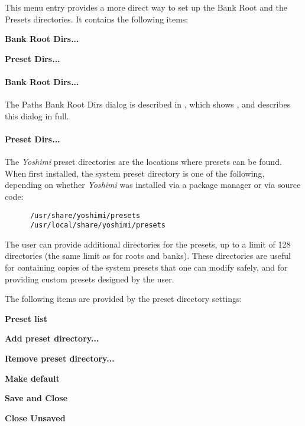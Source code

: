    This menu entry provides a more direct way to set up the Bank Root and
   the Presets directories.  It contains the following items:

   \begin{enumber}
      \item \textbf{Bank Root Dirs...}
      \item \textbf{Preset Dirs...}
   \end{enumber}

   \paragraph{Bank Root Dirs...}
   The Paths Bank Root Dirs dialog is described in
   ,
   which shows
   , and describes this dialog in full.

   \paragraph{Preset Dirs...}
   The \textsl{Yoshimi} preset directories are the locations where
   presets can be found.  When first installed, the system
   preset directory is one of the following, depending on whether
   \textsl{Yoshimi} was installed via a package manager or via source code:

   \begin{verbatim}
      /usr/share/yoshimi/presets
      /usr/local/share/yoshimi/presets
   \end{verbatim}
   
   The user can provide additional directories for the presets, up to a limit
   of 128 directories (the same limit as for roots and banks).
   These directories are useful for containing copies of the system
   presets that one can modify safely, and for providing custom
   presets designed by the user.

   The following items are provided by the preset directory settings:

   \begin{enumber}
      \item \textbf{Preset list}
      \item \textbf{Add preset directory...}
      \item \textbf{Remove preset directory...}
      \item \textbf{Make default}
      \item \textbf{Save and Close}
      \item \textbf{Close Unsaved}
   \end{enumber}

